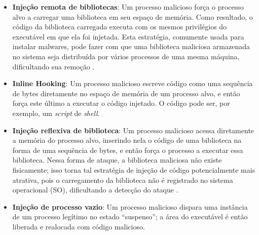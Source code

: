 \begin{itemize}
 \item \textbf{Injeção remota de bibliotecas}: Um processo malicioso força o processo alvo a carregar uma biblioteca em seu espaço de memória.
 Como resultado, o código da biblioteca carregada executa com os mesmos privilégios do executável em que ela foi injetada. 
 Esta estratégia, comumente usada para instalar malwares, pode fazer com que uma biblioteca maliciosa armazenada no sistema seja distribuída por vários processos de uma mesma máquina, dificultando sua remoção \cite{MillerRemoteLibraryInjection:2004}.
 \item \textbf{Inline Hooking}: Um processo malicioso escreve código como uma sequência de bytes diretamente no espaço de memória de um processo alvo, e então força este último a executar o código injetado. 
 O código pode ser, por exemplo, um \textit{script} de \textit{shell}.
 \item \textbf{Injeção reflexiva de biblioteca}: Um processo malicioso acessa diretamente a memória do processo alvo, inserindo nela o código de uma biblioteca na forma de uma sequência de bytes, e então força o processo a executar essa biblioteca. 
 Nessa forma de ataque, a biblioteca maliciosa não existe fisicamente; isso torna tal estratégia de injeção de código potencialmente mais atrativa, pois o carregamento da biblioteca não é registrado no sistema operacional (SO), dificultando a detecção do ataque \cite{FewerReflectiveLibraryInject:2008}.
 \item \textbf{Injeção de processo vazio}: Um processo malicioso dispara uma instância de um processo legítimo no estado ``suspenso''; a área do executável é então liberada e realocada com código malicioso.
\end{itemize}





